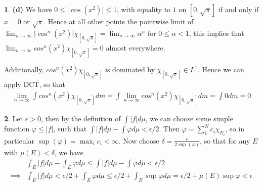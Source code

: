 \documentclass[10.5pt]{article}
\theoremstyle{definition}
\newtheorem{pb}{}
\newcommand{\abs}[1]{\lvert#1\rvert}
\newcommand{\tor}{\text{ or }}
\begin{document}
\begin{pb}
    \textbf{(d)} We have \(0 \leq \abs{\cos(x^2)} \leq 1\), with equality to \(1\) on \([0,\sqrt{\pi}]\) if and only if \(x = 0 \tor \sqrt{\pi}\).
    Hence at all other points the pointwise limit of 
    \(\lim_{n\to\infty}\abs{\cos^n(x^2)}\chi_{[0,\sqrt{\pi}]} = \lim_{n\to\infty}\alpha^n\) for \(0 \leq \alpha < 1\),
    this implies that \(\lim_{n\to\infty}cos^n(x^2)\chi_{[0,\sqrt{\pi}]} = 0\) almost everywhere.

    Additionally, \(cos^{n}(x^2)\chi_{[0,\sqrt{\pi}]}\) is dominated by \(\chi_{[0,\sqrt{\pi}]} \in L^1\). Hence we can apply DCT, so that
    \begin{align*}
        \lim_{n\to\infty} \int cos^n(x^2)\chi_{[0,\sqrt{\pi}]} dm = \int \lim_{n\to\infty} cos^n(x^2)\chi_{[0,\sqrt{\pi}]} dm
        = \int 0 dm = 0
    \end{align*}
\end{pb}
\begin{pb}
    Let \(\epsilon > 0\), then by the definition of \(\int \abs{f}d\mu\), we can choose some simple function \(\varphi \leq \abs{f}\), such that \(\int \abs{f}d\mu - \int \varphi d\mu < \epsilon/2\).
    Then \(\varphi = \sum_1^N c_i \chi_{E_i}\), so in particular \(\sup(\varphi) = \max_ic_i < \infty\). Now choose \(\delta = \frac{\epsilon}{2\sup(\varphi)}\), so that for any \(E\) with
    \(\mu(E) < \delta\), we have
    \begin{align*}
        &\int_E \abs{f}d\mu - \int_E \varphi d\mu \leq \int \abs{f}d\mu - \int \varphi d\mu < \epsilon/2 \\
        \implies &\int_E \abs{f}d\mu < \epsilon/2 + \int_E \varphi d\mu \leq \epsilon/2 + \int_E \sup \varphi d\mu 
        = \epsilon/2 + \mu(E) \sup \varphi < \epsilon
    \end{align*}
\end{pb}
\end{document}
